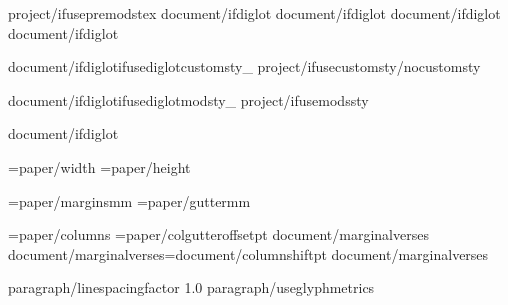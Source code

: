 


{project/ifusepremodstex}
{document/ifdiglot}\diglottrue
{document/ifdiglot}\diglotcolumns
{document/ifdiglot}
{document/ifdiglot}


{document/ifdiglot}{ifusediglotcustomsty_}
{project/ifusecustomsty}{/nocustomsty}

{document/ifdiglot}{ifusediglotmodsty_} %
{project/ifusemodssty} %

{document/ifdiglot}

\PaperWidth={paper/width}
\PaperHeight={paper/height}

\MarginUnit={paper/margins}mm
\def\TopMarginFactor{{{paper/topmarginfactor}}}
\def\BottomMarginFactor{{{paper/bottommarginfactor}}}
\def\SideMarginFactor{{1.0}}
\BindingGutter={paper/gutter}mm

\BodyColumns={paper/columns}
\def\ColumnGutterFactor{{{document/colgutterfactor}}}
\ColumnGutterRuleSkip={paper/colgutteroffset}pt
{document/marginalverses}
{document/marginalverses}\columnshift={document/columnshift}pt
{document/marginalverses}\def\AfterVerseSpaceFactor{{2}}
\def\PageFullFactor{{0.66}}

\def\LineSpaceBase{{{paragraph/linespacebase}}}
\def\LineSpacingFactor{L_}{{{paragraph/linespacingfactor}}}
\def\VerticalSpaceFactor{L_}{{1.0}}
{paragraph/useglyphmetrics}

